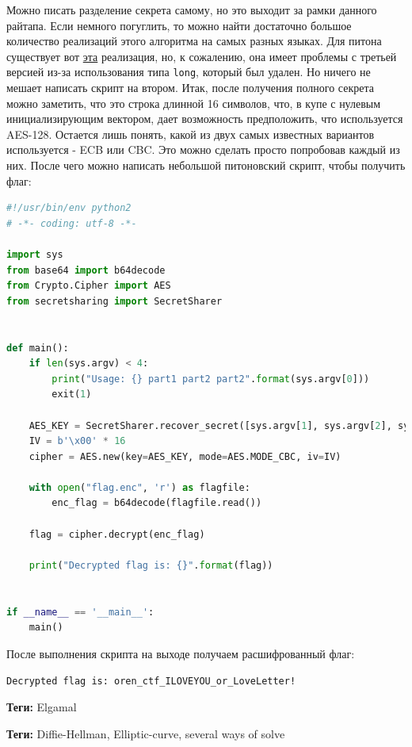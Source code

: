 \documentclass[idxtotoc,hyperref,openany,oneside]{files/crypto} %
\begin{document}
Можно писать разделение секрета самому, но это выходит за рамки данного райтапа. Если немного погуглить, то можно найти достаточно большое количество реализаций этого алгоритма на самых разных языках. Для питона существует вот \href{https://github.com/shea256/secret-sharing}{эта} реализация, но, к сожалению, она имеет проблемы с третьей версией из-за использования типа \verb|long|, который был удален. Но ничего не мешает написать скрипт на втором. Итак, после получения полного секрета можно заметить, что это строка длинной 16 символов, что, в купе с нулевым инициализирующим вектором, дает возможность предположить, что используется AES-128. Остается лишь понять, какой из двух самых известных вариантов используется - ECB или CBC. Это можно сделать просто попробовав каждый из них. После чего можно написать небольшой питоновский скрипт, чтобы получить флаг:
\newpage
\begin{lstlisting}[language=Python, caption=Расшифровка флага AES-CBC]
#!/usr/bin/env python2
# -*- coding: utf-8 -*-

import sys
from base64 import b64decode
from Crypto.Cipher import AES
from secretsharing import SecretSharer


def main():
    if len(sys.argv) < 4:
        print("Usage: {} part1 part2 part2".format(sys.argv[0]))
        exit(1)

    AES_KEY = SecretSharer.recover_secret([sys.argv[1], sys.argv[2], sys.argv[3]])
    IV = b'\x00' * 16
    cipher = AES.new(key=AES_KEY, mode=AES.MODE_CBC, iv=IV)

    with open("flag.enc", 'r') as flagfile:
        enc_flag = b64decode(flagfile.read())

    flag = cipher.decrypt(enc_flag)

    print("Decrypted flag is: {}".format(flag))


if __name__ == '__main__':
    main()
\end{lstlisting}

После выполнения скрипта на выходе получаем расшифрованный флаг: 

\verb|Decrypted flag is: oren_ctf_ILOVEYOU_or_LoveLetter!|




\textbf{Теги:} Elgamal\vspace{\baselineskip}





\textbf{Теги:} Diffie-Hellman, Elliptic-curve, several ways of solve\vspace{\baselineskip}



\end{document}

